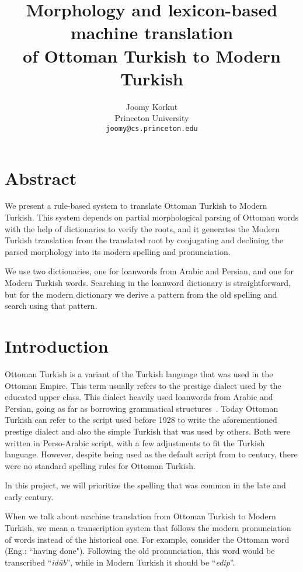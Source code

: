 \documentclass[10pt,twocolumn]{article}
\title{Morphology and lexicon-based machine translation\\of Ottoman Turkish to Modern Turkish}
\author{
  Joomy Korkut\\
  \normalsize Princeton University\\
  \normalsize \texttt{joomy@cs.princeton.edu}
}
\date{}
\theoremstyle{nonumberplain}
\newcommand{\otto}[1]{\RLE{\ottoman{}\Large{}#1}}
\newcommand{\word}[1]{``\emph{#1}''}
\begin{document}
\setlength{\abovedisplayskip}{-17pt}
\setlength{\belowdisplayskip}{0pt}
\setlength{\abovedisplayshortskip}{0pt}
\setlength{\belowdisplayshortskip}{0pt}

\maketitle

\section*{Abstract}
We present a rule-based system to translate Ottoman Turkish to Modern Turkish.
This system depends on partial morphological parsing of Ottoman words with the help of
dictionaries to verify the roots, and it generates the Modern Turkish
translation from the translated root by conjugating and declining the parsed
morphology into its modern spelling and pronunciation.

We use two dictionaries, one for loanwords from Arabic and
Persian, and one for Modern Turkish words. Searching in the loanword dictionary
is straightforward, but for the modern dictionary we derive a pattern from the
old spelling and search using that pattern.

\section{Introduction}

Ottoman Turkish is a variant of the Turkish language that was used in the
Ottoman Empire. This term usually refers to the prestige dialect used by the
educated upper class. This dialect heavily used loanwords from Arabic and
Persian, going as far as borrowing grammatical
structures~\cite{redhouse1884simplified, hagopian1907ottoman, strauss2011linguistic}.
Today Ottoman Turkish can refer to the script used before 1928 to write the
aforementioned prestige dialect and also the simple Turkish that was used by
others. Both were written in Perso-Arabic script, with a few adjustments to fit
the Turkish language.
However, despite being used as the default script from  to 
century, there were no standard spelling rules for Ottoman Turkish.

In this project, we will prioritize the spelling that was common
in the late  and early  century.

When we talk about machine translation from Ottoman Turkish to Modern Turkish,
we mean a transcription system that follows the modern pronunciation of words
instead of the historical one.
For example, consider the Ottoman word \otto{ايدوب} (Eng.: ``having done").
Following the old pronunciation, this word would be transcribed \word{idüb}, while
in Modern Turkish it should be \word{edip}.
\end{document}
